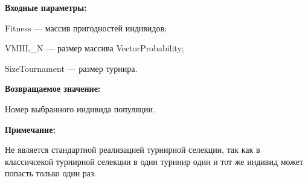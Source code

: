 \textbf{Входные параметры:}
 
Fitness --- массив пригодностей индивидов;
 
VMHL\_N --- размер массива VectorProbability;
 
SizeTournament --- размер турнира.

\textbf{Возвращаемое значение:} 

 Номер выбранного индивида популяции.

\textbf{Примечание:}

 Не является стандартной реализацией турнирной селекции, так как в классичсекой турнирной селекции в один туринир один и тот же индивид может попасть только один раз.

